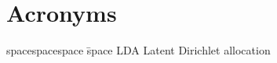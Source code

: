 \section*{Acronyms}

\begin{tabbing}
spacespacespace \= space \kill
LDA	\>	Latent Dirichlet allocation \\
\end{tabbing}